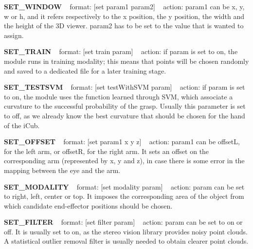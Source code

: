 {\bfseries S\+E\+T\+\_\+\+W\+I\+N\+D\+OW} ~\newline
format\+: \mbox{[}set param1 param2\mbox{]} ~\newline
action\+: param1 can be x, y, w or h, and it refers respectively to the x position, the y position, the width and the height of the 3D viewer. param2 has to be set to the value that is wanted to assign.

{\bfseries S\+E\+T\+\_\+\+T\+R\+A\+IN} ~\newline
format\+: \mbox{[}set train param\mbox{]} ~\newline
action\+: if param is set to on, the module runs in training modality; this means that points will be chosen randomly and saved to a dedicated file for a later training stage.

{\bfseries S\+E\+T\+\_\+\+T\+E\+S\+T\+S\+VM} ~\newline
format\+: \mbox{[}set test\+With\+S\+VM param\mbox{]} ~\newline
action\+: if param is set to on, the module uses the function learned through S\+VM, which associate a curvature to the successful probability of the grasp. Usually this parameter is set to off, as we already know the best curvature that should be chosen for the hand of the i\+Cub.

{\bfseries S\+E\+T\+\_\+\+O\+F\+F\+S\+ET} ~\newline
format\+: \mbox{[}set param1 x y z\mbox{]} ~\newline
action\+: param1 can be offsetL, for the left arm, or offsetR, for the right arm. It sets an offset on the corresponding arm (represented by x, y and z), in case there is some error in the mapping between the eye and the arm.

{\bfseries S\+E\+T\+\_\+\+M\+O\+D\+A\+L\+I\+TY} ~\newline
format\+: \mbox{[}set modality param\mbox{]} ~\newline
action\+: param can be set to right, left, center or top. It imposes the corresponding area of the object from which candidate end-\/effector positions should be chosen.

{\bfseries S\+E\+T\+\_\+\+F\+I\+L\+T\+ER} ~\newline
format\+: \mbox{[}set filter param\mbox{]} ~\newline
action\+: param can be set to on or off. It is usually set to on, as the stereo vision library provides noisy point clouds. A statistical outlier removal filter is usually needed to obtain clearer point clouds.

